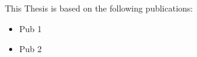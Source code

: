 \begin{publications}

This Thesis is based on the following publications:
\begin{itemize}
\item Pub 1
\item Pub 2
\end{itemize}

\end{publications}